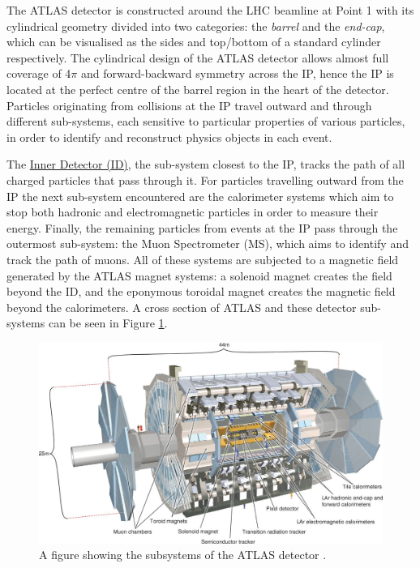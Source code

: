 \documentclass[12pt,a4paper,epsf,portrait,times,epsfig]{article}
\begin{document}
		The ATLAS detector is constructed around the LHC beamline at Point 1 with its cylindrical geometry divided into two categories: the \textit{barrel} and the \textit{end-cap}, which can be visualised as the sides and top/bottom of a standard cylinder respectively. The cylindrical design of the ATLAS detector allows almost full coverage of 4$\pi$ and forward-backward symmetry across the IP, hence the IP is located at the perfect centre of the barrel region in the heart of the detector. Particles originating from collisions at the IP travel outward and through different sub-systems, each sensitive to particular properties of various particles, in order to identify and reconstruct physics objects in each event. \par 


		The \hyperref[Section:InnerDetector]{Inner Detector (ID)}, the sub-system closest to the IP, tracks the path of all charged particles that pass through it. For particles travelling outward from the IP the next sub-system encountered are the calorimeter systems which aim to stop both hadronic and electromagnetic particles in order to measure their energy. Finally, the remaining particles from events at the IP pass through the outermost sub-system: the Muon Spectrometer (MS), which aims to identify and track the path of muons. All of these systems are subjected to a magnetic field generated by the ATLAS magnet systems: a solenoid magnet creates the field beyond the ID, and the eponymous toroidal magnet creates the magnetic field beyond the calorimeters. A cross section of ATLAS and these detector sub-systems can be seen in Figure \ref{Fig:ATLASDetector}.

		\begin{figure}
			\centering
			\includegraphics{ATLAS}
			\caption{A figure showing the subsystems of the ATLAS detector \cite{Article:ATLASDesignPaper}.}
			\label{Fig:ATLASDetector}
		\end{figure}
\end{document}
